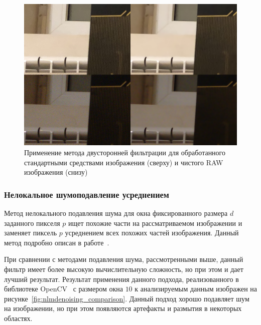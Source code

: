 \documentclass[14pt]{mmcs_article}
\begin{document}
\begin{figure}[H]
	\centering
	\includegraphics[width=\textwidth]{img/bilinear_comparison}
	\caption{Применение метода двусторонней фильтрации для обработанного стандартными средствами изображения (сверху) и чистого RAW изображения (снизу)}
	\label{fig:bilinear_comparison}
\end{figure}

\subsubsection{Нелокальное шумоподавление усреднением}
Метод нелокального подавления шума для окна фиксированного размера $d$ заданного пикселя $p$ ищет похожие части на рассматриваемом изображении и заменяет пиксель $p$ усреднением всех похожих частей изображения. Данный метод подробно описан в работе~\autocite{NonLocalMeansDenoising}.

При сравнении с методами подавления шума, рассмотренными выше, данный фильтр имеет более высокую вычислительную сложность, но при этом и дает лучший результат. Результат применения данного подхода, реализованного в библиотеке OpenCV~\autocite{OpenCVLib} с размером окна $10$ к анализируемым данным изображен на рисунке~\ref{fig:nlmdenoising_comparison}. Данный подход хорошо подавляет шум на изображении, но при этом появляются артефакты и размытия в некоторых областях.
\end{document}
